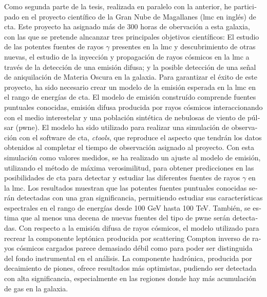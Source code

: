 \documentclass[main.tex]{subfiles}
\begin{document}
\begin{otherlanguage}{spanish}
Como segunda parte de la tesis, realizada en paralelo con la anterior, he participado en el proyecto científico de la Gran Nube de Magallanes (\gls{lmc} en inglés) de \gls{cta}. Este proyecto ha asignado más de 300 horas de obervación a esta galaxia, con las que se pretende alncanzar tres principales objetivos científicos: El estudio de las potentes fuentes de rayos $\gamma$ presentes en la \gls{lmc} y descubrimiento de otras nuevas, el estudio de la inyección y propagación de rayos cósmicos en la \gls{lmc} a través de la detección de una emisión difusa; y la posible detección de una señal de aniquilación de Materia Oscura en la galaxia. Para garantizar el éxito de este proyecto, ha sido necesario crear un modelo de la emisión esperada en la \gls{lmc} en el rango de energías de \gls{cta}. El modelo de emisión construído comprende fuentes puntuales conocidas, emisión difusa producida por rayos cósmicos interaccionando con el medio interestelar y una población sintética de nebulosas de viento de púlsar (\gls{pwne}). El modelo ha sido utilizado para realizar una simulación de observación con el software de \gls{cta}, \textit{ctools}, que reproduce el aspecto que tendrán los datos obtenidos al completar el tiempo de observación asignado al proyecto. Con esta simulación como valores medidos, se ha realizado un ajuste al modelo de emisión, utilizando el método de máxima verosimilitud, para obtener predicciones en las posibilidades de \gls{cta} para detectar y estudiar las diferentes fuentes de rayos $\gamma$ en la \gls{lmc}. Los resultados muestran que las potentes fuentes puntuales conocidas serán detectadas con una gran significancia, permitiendo estudiar sus características espectrales en el rango de energías desde 100 GeV hasta 100 TeV. También, se estima que al menos una decena de nuevas fuentes del tipo de \gls{pwne} serán detectadas. Con respecto a la emisión difusa de rayos cósmicos, el modelo utilizado para recrear la componente leptónica producida por scattering Compton inverso de rayos cósmicos cargados parece demasiado débil como para poder ser distinguida del fondo instrumental en el análisis. La componente hadrónica, producida por decaimiento de piones, ofrece resultados más optimistas, pudiendo ser detectada con alta significancia, especialmente en las regiones donde hay más acumulación de gas en la galaxia.\\

\end{otherlanguage}
\end{document}
